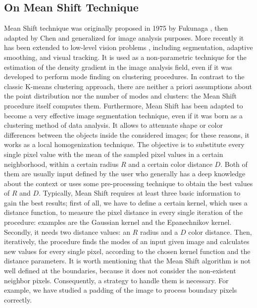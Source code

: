 {	\subsection{On Mean Shift Technique}
	Mean Shift technique was originally proposed in 1975 by Fukunaga \cite{fukunaga}, then adapted by Chen \cite{Pan} and generalized for image analysis purposes. More recently it has been extended to low-level vision problems \cite{Foran}, including segmentation, adaptive smoothing, and visual tracking. It is used as a non-parametric technique for the estimation of the density gradient in the image analysis field, even if it was developed to perform mode finding on clustering procedures. In contrast to the classic K-means clustering approach, there are neither a priori assumptions about the point distribution nor the number of modes and clusters: the Mean Shift procedure itself computes them. Furthermore, Mean Shift has been adapted to become a very effective image segmentation technique, even if it was born as a clustering method of data analysis. It allows to attenuate shape or color differences between the objects inside the considered images; for these reasons, it works as a local homogenization technique. The objective is to substitute every single pixel value with the mean of the sampled pixel values in a certain neighborhood, within a certain radius $R$ and a certain color distance $D$. Both of them are usually input defined by the user who generally has a deep knowledge about the context or uses some pre-processing technique to obtain the best values of $R$ and $D$. Typically, Mean Shift requires at least three basic information to gain the best results; first of all, we have to define a certain kernel, which uses a distance function, to measure the pixel distance in every single iteration of the procedure: examples are the Gaussian kernel and the Epanechnikov kernel. Secondly, it needs two distance values: an $R$ radius and a $D$ color distance. Then, iteratively, the procedure finds the modes of an input given image and calculates new values for every single pixel, according to the chosen kernel function and the distance parameters. It is worth mentioning that the Mean Shift algorithm is not well defined at the boundaries, because it does not consider the non-existent neighbor pixels. Consequently, a strategy to handle them is necessary. For example, we have studied a padding of the image to process boundary pixels correctly.
	
}
